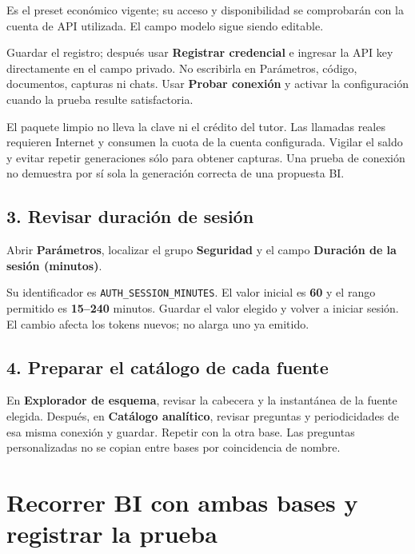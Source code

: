 \documentclass[
  spanish,
  10pt,
  a4paper,
]{article}
\begin{document}
Es el preset económico vigente; su acceso y disponibilidad se
comprobarán con la cuenta de API utilizada. El campo modelo sigue siendo
editable.

Guardar el registro; después usar \textbf{Registrar credencial} e
ingresar la API key directamente en el campo privado. No escribirla en
Parámetros, código, documentos, capturas ni chats. Usar \textbf{Probar
conexión} y activar la configuración cuando la prueba resulte
satisfactoria.

El paquete limpio no lleva la clave ni el crédito del tutor. Las
llamadas reales requieren Internet y consumen la cuota de la cuenta
configurada. Vigilar el saldo y evitar repetir generaciones sólo para
obtener capturas. Una prueba de conexión no demuestra por sí sola la
generación correcta de una propuesta BI.

\subsection{3. Revisar duración de
sesión}\label{revisar-duraciuxf3n-de-sesiuxf3n}

Abrir \textbf{Parámetros}, localizar el grupo \textbf{Seguridad} y el
campo \textbf{Duración de la sesión (minutos)}.

Su identificador es \texttt{AUTH\_SESSION\_MINUTES}. El valor inicial es
\textbf{60} y el rango permitido es \textbf{15--240} minutos. Guardar el
valor elegido y volver a iniciar sesión. El cambio afecta los tokens
nuevos; no alarga uno ya emitido.

\subsection{4. Preparar el catálogo de cada
fuente}\label{preparar-el-catuxe1logo-de-cada-fuente}

En \textbf{Explorador de esquema}, revisar la cabecera y la instantánea
de la fuente elegida. Después, en \textbf{Catálogo analítico}, revisar
preguntas y periodicidades de esa misma conexión y guardar. Repetir con
la otra base. Las preguntas personalizadas no se copian entre bases por
coincidencia de nombre.

\clearpage

\section{Recorrer BI con ambas bases y registrar la
prueba}\label{recorrer-bi-con-ambas-bases-y-registrar-la-prueba}
\end{document}
